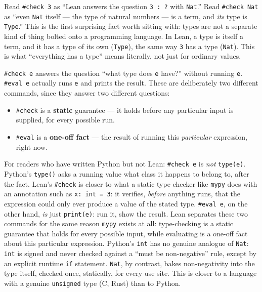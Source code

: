 Read \texttt{\#check 3} as ``Lean answers the question \texttt{3 : ?} with \texttt{Nat}.'' Read \texttt{\#check Nat} as ``even \texttt{Nat} itself --- the type of natural numbers --- is a term, and \emph{its} type is \texttt{Type}.'' This is the first surprising fact worth sitting with: types are not a separate kind of thing bolted onto a programming language. In Lean, a type is itself a term, and it has a type of its own (\texttt{Type}), the same way \texttt{3} has a type (\texttt{Nat}). This is what ``everything has a type'' means literally, not just for ordinary values.

\texttt{\#check e} answers the question ``what type does \texttt{e} have?'' without running \texttt{e}. \texttt{\#eval e} actually runs \texttt{e} and prints the result. These are deliberately two different commands, since they answer two different questions:

\begin{itemize}
\tightlist
\item
  \texttt{\#check} is a \textbf{static} guarantee --- it holds before any particular input is supplied, for every possible run.
\item
  \texttt{\#eval} is a \textbf{one-off fact} --- the result of running this \emph{particular} expression, right now.
\end{itemize}

\begin{progcorner}

For readers who have written Python but not Lean: \texttt{\#check e} is \emph{not} \texttt{type(e)}. Python's \texttt{type()} asks a running value what class it happens to belong to, after the fact. Lean's \texttt{\#check} is closer to what a static type checker like \texttt{mypy} does with an annotation such as \texttt{x: int = 3}: it verifies, \emph{before} anything runs, that the expression could only ever produce a value of the stated type. \texttt{\#eval e}, on the other hand, \emph{is} just \texttt{print(e)}: run it, show the result. Lean separates these two commands for the same reason \texttt{mypy} exists at all: type-checking is a static guarantee that holds for every possible input, while evaluating is a one-off fact about this particular expression. Python's \texttt{int} has no genuine analogue of \texttt{Nat}: \texttt{int} is signed and never checked against a ``must be non-negative'' rule, except by an explicit runtime \texttt{if} statement. \texttt{Nat}, by contrast, bakes non-negativity into the type itself, checked once, statically, for every use site. This is closer to a language with a genuine \texttt{unsigned} type (C, Rust) than to Python.

\end{progcorner}

